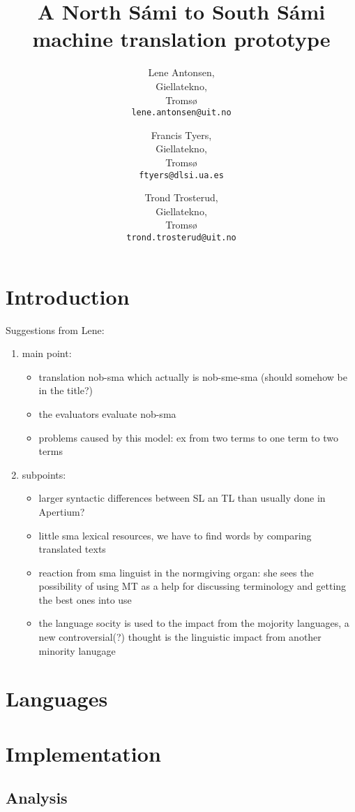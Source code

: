 \documentclass[a4paper,11pt,twocolumn]{article}
\title{A North Sámi to South Sámi machine translation prototype}
\author{Lene Antonsen,\\Giellatekno,\\Tromsø\\{\tt lene.antonsen@uit.no}
\and Francis Tyers,\\Giellatekno,\\Tromsø\\{\tt ftyers@dlsi.ua.es}
\and Trond Trosterud,\\Giellatekno,\\Tromsø\\{\tt trond.trosterud@uit.no}}
\date{}
\begin{document}
\maketitle

\section{Introduction}
Suggestions from Lene:  
\begin{enumerate}
\item main point: 
\begin{itemize}
\item translation nob-sma which actually is nob-sme-sma (should somehow be in the title?) 
\item the evaluators evaluate nob-sma
\item problems caused by this model: ex from two terms to one term to two terms
\end{itemize}
\item subpoints: 
\begin{itemize}
\item larger syntactic differences between SL an TL than usually done in Apertium?
\item little sma lexical resources, we have to find words by comparing translated texts
\item reaction from sma linguist in the normgiving organ: she sees the possibility of using MT as a help for discussing terminology and getting the best ones into use
\item the language socity is used to the impact from the mojority languages, a new controversial(?) thought is the linguistic impact from another minority lanugage 
\end{itemize}
\end{enumerate}


\cite{tyers09} \cite{wiechetek10} \cite{trosterud12}

\section{Languages}


\section{Implementation}


\subsection{Analysis}
\end{document}
